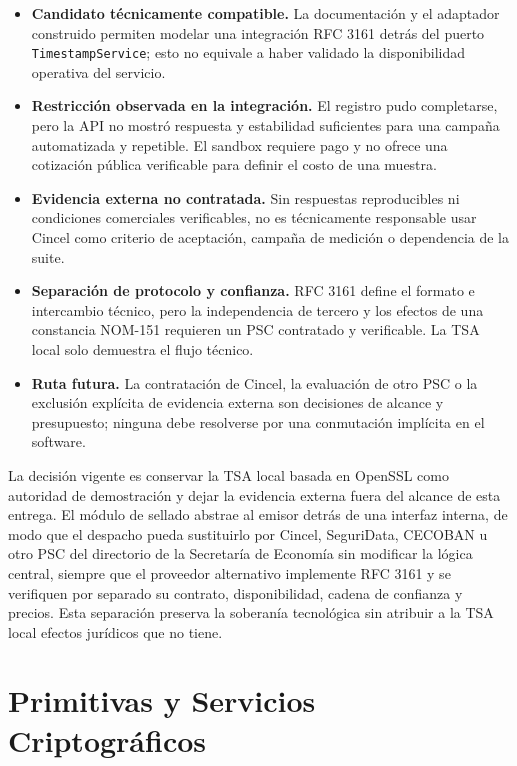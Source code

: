 \begin{itemize}
  \item \textbf{Candidato técnicamente compatible.} La documentación y el adaptador construido permiten modelar una integración RFC 3161 detrás del puerto \texttt{TimestampService}; esto no equivale a haber validado la disponibilidad operativa del servicio.

  \item \textbf{Restricción observada en la integración.} El registro pudo completarse, pero la API no mostró respuesta y estabilidad suficientes para una campaña automatizada y repetible. El sandbox requiere pago y no ofrece una cotización pública verificable para definir el costo de una muestra.

  \item \textbf{Evidencia externa no contratada.} Sin respuestas reproducibles ni condiciones comerciales verificables, no es técnicamente responsable usar Cincel como criterio de aceptación, campaña de medición o dependencia de la suite.

  \item \textbf{Separación de protocolo y confianza.} RFC 3161 define el formato e intercambio técnico, pero la independencia de tercero y los efectos de una constancia NOM-151 requieren un PSC contratado y verificable. La TSA local solo demuestra el flujo técnico.

  \item \textbf{Ruta futura.} La contratación de Cincel, la evaluación de otro PSC o la exclusión explícita de evidencia externa son decisiones de alcance y presupuesto; ninguna debe resolverse por una conmutación implícita en el software.
\end{itemize}

La decisión vigente es conservar la TSA local basada en OpenSSL como autoridad de demostración y dejar la evidencia externa fuera del alcance de esta entrega. El módulo de sellado abstrae al emisor detrás de una interfaz interna, de modo que el despacho pueda sustituirlo por Cincel, SeguriData, CECOBAN u otro PSC del directorio de la Secretaría de Economía sin modificar la lógica central, siempre que el proveedor alternativo implemente RFC 3161 y se verifiquen por separado su contrato, disponibilidad, cadena de confianza y precios. Esta separación preserva la soberanía tecnológica sin atribuir a la TSA local efectos jurídicos que no tiene.

\section{Primitivas y Servicios Criptográficos}\label{sec:primitivas-cripto}

